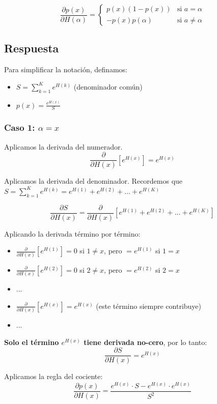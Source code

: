 \documentclass[12pt,a4paper]{article}
\begin{document}
$$\frac{\partial p(x)}{\partial H(\alpha)} = \begin{cases}
p(x)(1 - p(x)) & \text{si } a = \alpha \\
-p(x)p(\alpha) & \text{si } a \neq \alpha 
\end{cases} $$

\subsection{Respuesta}

Para simplificar la notación, definamos:
\begin{itemize}
    \item $S = \sum_{k=1}^{K} e^{H(k)}$ (denominador común)
    \item $p(x) = \frac{e^{H(x)}}{S}$
\end{itemize}

\subsubsection{Caso 1: $\alpha = x$}

Aplicamos la derivada del numerador.
$$\frac{\partial}{\partial H(x)}[e^{H(x)}] = e^{H(x)}$$

Aplicamos la derivada del denominador. Recordemos que $S = \sum_{k=1}^{K} e^{H(k)} = e^{H(1)} + e^{H(2)} + ... + e^{H(K)}$

$$\frac{\partial S}{\partial H(x)} = \frac{\partial}{\partial H(x)}\left[e^{H(1)} + e^{H(2)} + ... + e^{H(K)}\right]$$

Aplicando la derivada término por término:
\begin{itemize}
    \item $\frac{\partial}{\partial H(x)}[e^{H(1)}] = 0$ si $1 \neq x$, pero $= e^{H(1)}$ si $1 = x$
    \item $\frac{\partial}{\partial H(x)}[e^{H(2)}] = 0$ si $2 \neq x$, pero $= e^{H(2)}$ si $2 = x$
    \item ...
    \item $\frac{\partial}{\partial H(x)}[e^{H(x)}] = e^{H(x)}$ (este término siempre contribuye)
    \item ...
\end{itemize}

\textbf{Solo el término $e^{H(x)}$ tiene derivada no-cero}, por lo tanto:
$$\frac{\partial S}{\partial H(x)} = e^{H(x)}$$

Aplicamos la regla del cociente:
$$\frac{\partial p(x)}{\partial H(x)} = \frac{e^{H(x)} \cdot S - e^{H(x)} \cdot e^{H(x)}}{S^2}$$
\end{document}
